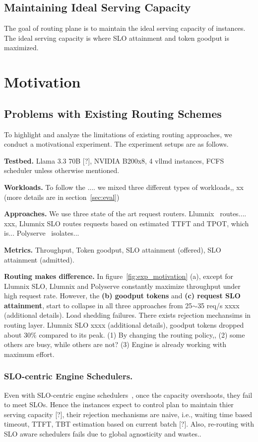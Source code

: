 \subsection{Maintaining Ideal Serving Capacity}
The goal of routing plane is to maintain the ideal serving capacity of instances. The ideal serving capacity is where SLO attainment and token goodput is maximized.




\section{Motivation}
\subsection{Problems with Existing Routing Schemes}
To highlight and analyze the limitations of existing routing approaches, we conduct a motivational experiment. The experiment setups are as follows.

\noindent\textbf{Testbed.}
Llama 3.3 70B [?], NVIDIA B200x8, 4 vllmd instances, FCFS scheduler unless otherwise mentioned.

\noindent\textbf{Workloads.}
To follow the .... we mixed three different types of workloads,, xx (more details are in section~\ref{sec:eval})

\noindent\textbf{Approaches.}
We use three state of the art request routers. Llumnix~\cite{Llumnix} routes.... xxx, Llumnix SLO routes requests based on estimated TTFT and TPOT, which is... Polyserve~\cite{polyserve} isolates...

\noindent\textbf{Metrics.}
Throughput, Token goodput, SLO attainment (offered), SLO attainment (admitted).

\textbf{Routing makes difference.}
In figure~\ref{fig:exp_motivation} (a), except for Llumnix SLO, Llumnix and Polyserve constantly maximize throughput under high request rate. However, the \textbf{(b) goodput tokens} and \textbf{(c) request SLO attainment}, start to collapse in all three approaches from 25$\sim$35 req/s xxxx (additional details).
Load shedding failures. There exists rejection mechansims in routing layer. Llumnix SLO xxxx (additional details), goodput tokens dropped about $30\%$ compared to its peak.
(1) By changing the routing policy,, (2) some others are busy, while others are not? (3) Engine is already working with maximum effort.



\subsubsection{SLO-centric Engine Schedulers.}
Even with SLO-centric engine schedulers~\cite{QoServe,jitserve,Agentix}, once the capacity overshoots, they fail to meet SLOs. Hence the instances expect to control plan to maintain thier serving capacity [?], their rejection mechanisms are naive, i.e., waiting time based timeout, TTFT, TBT estimation based on current batch [?]. Also, re-routing with SLO aware schedulers fails due to global agnosticity and wastes..


